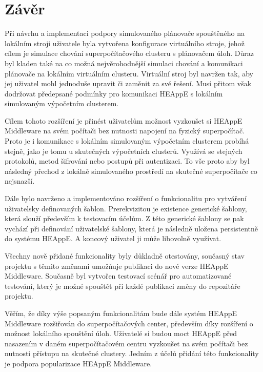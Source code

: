 \chapter{Závěr}
Při návrhu a implementaci podpory simulovaného plánovače spouštěného na lokálním stroji uživatele byla vytvořena konfigurace virtuálního stroje, jehož cílem je simulace chování superpočítačového clusteru s plánovačem úloh. Důraz byl kladen také na co možná nejvěrohodnější simulaci chování a komunikaci plánovače na lokálním virtuálním clusteru. Virtuální stroj byl navržen tak, aby jej uživatel mohl jednoduše upravit či zaměnit za své řešení. Musí přitom však dodržovat předepsané podmínky pro komunikaci HEAppE s lokálním simulovaným výpočetním clusterem.

Cílem tohoto rozšíření je přinést uživatelům možnost vyzkoušet si HEAppE Middleware na svém počítači bez nutnosti napojení na fyzický superpočítač. Proto je i komunikace s lokálním simulovaným výpočetním clusterem probíhá stejně, jako je tomu u skutečných výpočetních clusterů. Využívá se stejných protokolů, metod šifrování nebo postupů při autentizaci. To vše proto aby byl následný přechod z lokálně simulovaného prostředí na skutečné superpočítače co nejsnazší.

Dále bylo navrženo a implementováno rozšíření o funkcionalitu pro vytváření uživatelsky definovaných šablon. Prerekvizitou je existence generické šablony, která slouží především k testovacím účelům. Z této generické šablony se pak vychází při definování uživatelské šablony, která je následně uložena persistentně do systému HEAppE. A koncový uživatel ji může libovolně využívat.

Všechny nově přidané funkcionality byly důkladně otestovány, současný stav projektu s těmito změnami umožňuje publikaci do nové verze HEAppE Middleware. Současně byl vytvořen testovací scénář pro automatizované testování, který je možné spouštět při každé publikaci změny do repozitáře projektu.

Věřím, že díky výše popsaným funkcionalitám bude dále systém HEAppE Middleware rozšiřován do superpočítačových center, především díky rozšíření o možnost lokálního spouštění úloh. Uživatelé si budou moct HEAppE před nasazením v daném superpočítačovém centru vyzkoušet na svém počítači bez nutnosti přístupu na skutečné clustery. Jedním z účelů přidání této funkcionality je podpora popularizace HEAppE Middleware.
\endinput